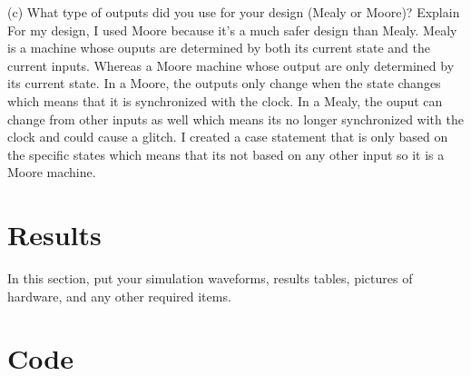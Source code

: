 \documentclass[11pt]{article}
\newcommand{\Verilog}[2][]{%
	
}
\begin{document}
(c) What type of outputs did you use for your design (Mealy or Moore)? Explain \newline
 For my design, I used Moore because it's a much safer design than Mealy. Mealy is a machine whose ouputs are determined by both its current state and the current inputs. Whereas a Moore machine whose output are only determined by its current state. In a Moore, the outputs only change when the state changes which means that it is synchronized with the clock. In a Mealy, the ouput can change from other inputs as well which means its no longer synchronized with the clock and could cause a glitch. I created a case statement that is only based on the specific states which means that its not based on any other input so it is a Moore machine. 



\section*{Results}

In this section, put your simulation waveforms, results tables, pictures of hardware, and any other required items.


\section*{Code}

\Verilog{Lab11/systemverilog/guess_FSM.sv}

\Verilog{Lab11/systemverilog/guess_FSM_test.sv}

\Verilog{Lab11/systemverilog/guessing_game.sv}

\Verilog{Lab11/systemverilog/guessing_game_test.sv}
\end{document}
